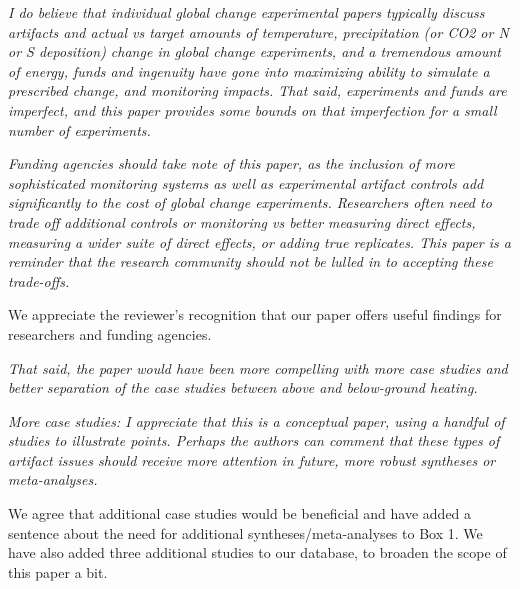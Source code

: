\documentclass[11pt,a4paper]{letter}
\begin{document}
\begin{letter}{}
\par \emph{I do believe that individual global change experimental papers typically discuss artifacts and actual vs target amounts of temperature, precipitation (or CO2 or N or S deposition) change in global change experiments, and a  tremendous amount of energy, funds and ingenuity have gone into maximizing ability to simulate a prescribed change, and monitoring impacts.  That said, experiments and funds are imperfect, and this paper provides some bounds on that imperfection for a small number of experiments.}

\par \emph{Funding agencies should take note of this paper, as the inclusion of more sophisticated monitoring systems as well as experimental artifact controls add significantly to the cost of global change experiments.  Researchers often need to trade off additional controls or monitoring vs better measuring direct effects, measuring a wider suite of direct effects, or adding true replicates.  This paper is a reminder that the research community should not be lulled in to accepting these trade-offs.}

\par We appreciate the reviewer's recognition that our paper offers useful findings for researchers and funding agencies. 

\par \emph{That said, the paper would have been more compelling with more case studies and better separation of the case studies between above and below-ground heating.}

\par \emph{More case studies:  I appreciate that this is a conceptual paper, using a handful of studies to illustrate points.  Perhaps the authors can comment that these types of artifact issues should receive more attention in future, more robust syntheses or meta-analyses.}
\par We agree that additional case studies would be beneficial and have added a sentence about the need for additional syntheses/meta-analyses to Box 1. We have also added three additional studies to our database, to broaden the scope of this paper a bit.  


\end{letter}
\end{document}
